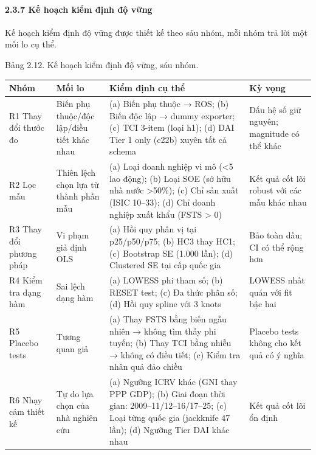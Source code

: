 \documentclass[12pt,a4paper]{article}
\begin{document}
\hypertarget{237-kux1ebf-houx1ea1ch-kiux1ec3m-ux111ux1ecbnh-ux111ux1ed9-vux1eefng}{%
\paragraph{2.3.7 Kế hoạch kiểm định độ
vững}\label{237-kux1ebf-houx1ea1ch-kiux1ec3m-ux111ux1ecbnh-ux111ux1ed9-vux1eefng}}

Kế hoạch kiểm định độ vững được thiết kế theo sáu nhóm, mỗi nhóm trả lời
một mối lo cụ thể.

Bảng 2.12. Kế hoạch kiểm định độ vững, sáu nhóm.

\begin{longtable}[]{@{}llll@{}}
\toprule\noalign{}
Nhóm & Mối lo & Kiểm định cụ thể & Kỳ vọng \\
\midrule\noalign{}
\endhead
\bottomrule\noalign{}
\endlastfoot
R1 Thay đổi thước đo & Biến phụ thuộc/độc lập/điều tiết khác nhau & (a)
Biến phụ thuộc → ROS; (b) Biến độc lập → dummy exporter; (c) TCI 3-item
(loại h1); (d) DAI Tier 1 only (c22b) xuyên tất cả schema & Dấu hệ số
giữ nguyên; magnitude có thể khác \\
R2 Lọc mẫu & Thiên lệch chọn lựa từ thành phần mẫu & (a) Loại doanh
nghiệp vi mô (\textless5 lao động); (b) Loại SOE (sở hữu nhà nước
\textgreater50\%); (c) Chỉ sản xuất (ISIC 10--33); (d) Chỉ doanh nghiệp
xuất khẩu (FSTS \textgreater{} 0) & Kết quả cốt lõi robust với các mẫu
khác nhau \\
R3 Thay đổi phương pháp & Vi phạm giả định OLS & (a) Hồi quy phân vị tại
p25/p50/p75; (b) HC3 thay HC1; (c) Bootstrap SE (1.000 lần); (d)
Clustered SE tại cấp quốc gia & Bảo toàn dấu; CI có thể rộng hơn \\
R4 Kiểm tra dạng hàm & Sai lệch dạng hàm & (a) LOWESS phi tham số; (b)
RESET test; (c) Đa thức phân số; (d) Hồi quy spline với 3 knots & LOWESS
nhất quán với fit bậc hai \\
R5 Placebo tests & Tương quan giả & (a) Thay FSTS bằng biến ngẫu nhiên →
không tìm thấy phi tuyến; (b) Thay TCI bằng nhiễu → không có điều tiết;
(c) Kiểm tra nhân quả đảo chiều & Placebo tests không cho kết quả có ý
nghĩa \\
R6 Nhạy cảm thiết kế & Tự do lựa chọn của nhà nghiên cứu & (a) Ngưỡng
ICRV khác (GNI thay PPP GDP); (b) Giai đoạn thời gian:
2009--11/12--16/17--25; (c) Loại từng quốc gia (jackknife 47 lần); (d)
Ngưỡng Tier DAI khác nhau & Kết quả cốt lõi ổn định \\
\end{longtable}
\end{document}

